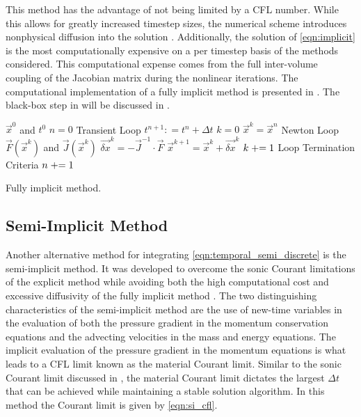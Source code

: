 This method has the advantage of not being limited by a CFL number.
While this allows for greatly increased timestep sizes, the numerical scheme introduces nonphysical diffusion into the solution \cite{Mahaffy1993}.
Additionally, the solution of \eqref{eqn:implicit} is the most computationally expensive on a per timestep basis of the methods considered.
This computational expense comes from the full inter-volume coupling of the Jacobian matrix during the nonlinear iterations.
The computational implementation of a fully implicit method is presented in .
The black-box step in  will be discussed in .

\begin{algo}[ht!]
\setlength{\baselineskip}{0.625\baselineskip}
\begin{algorithmic}[1]
\Require $\vec{x}^{0}$ and $t^{0}$
\Set $n = 0$
\Loop \; Transient Loop
    \Set $t^{n+1} : = t^{n} + \Delta t$
    \Set $k = 0$
    \Set $\vec{x}^{k} = \vec{x}^{n}$
    \Loop \; Newton Loop
		\Calculate $\vec{F}(\vec{x}^{k})$ and $\vec{J}(\vec{x}^{k})$
		\Calculate $\vec{\delta x}^k = - \vec{J}^{-1}\cdot\vec{F}$
		\Calculate $\vec{x}^{k+1} = \vec{x}^{k} + \vec{\delta x}^{k}$
		\Set $k \mathrel{+}= 1$
		\BlackBox Loop Termination Criteria
	\EndLoop	
	\Set $n \mathrel{+}= 1$
\EndLoop
\end{algorithmic}
\caption{Fully implicit method.}
\label{algo:implicit}
\end{algo}

\subsection{Semi-Implicit Method}
\label{subsect:semi_implicit}

Another alternative method for integrating \eqref{eqn:temporal_semi_discrete} is the semi-implicit method.
It was developed to overcome the sonic Courant limitations of the explicit method while avoiding both the high computational cost and excessive diffusivity of the fully implicit method \cite{Liles1978}.
The two distinguishing characteristics of the semi-implicit method are the use of new-time variables in the evaluation of both the pressure gradient in the momentum conservation equations and the advecting velocities in the mass and energy equations. 
The implicit evaluation of the pressure gradient in the momentum equations is what leads to a CFL limit known as the material Courant limit.
Similar to the sonic Courant limit discussed in , the material Courant limit dictates the largest $\Delta t$ that can be achieved while maintaining a stable solution algorithm.
In this method the Courant limit is given by \eqref{eqn:si_cfl}.

